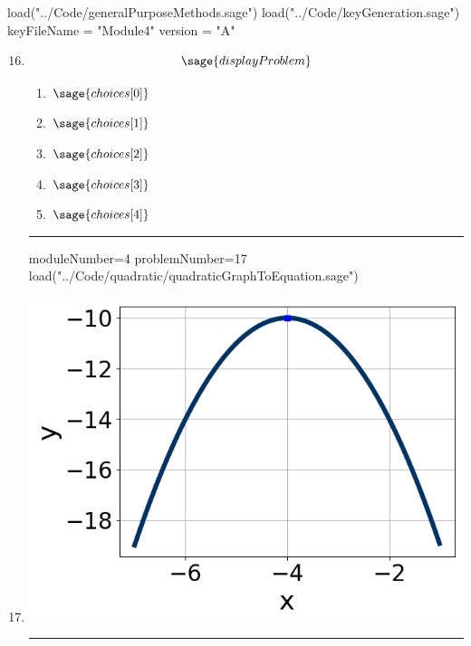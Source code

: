 \documentclass[14pt]{article}
\newcommand{\litem}[1]{\item#1\hspace*{-1cm}\rule{\textwidth}{0.4pt}}
\begin{document}
\pagestyle{fancy}

\begin{sagesilent}
load("../Code/generalPurposeMethods.sage")
load("../Code/keyGeneration.sage")
keyFileName = "Module4"
version = "A"
\end{sagesilent}

\begin{enumerate}
\setcounter{enumi}{15}


\begin{sagesilent}
moduleNumber=4
problemNumber=16
load("../Code/quadratic/quadraticFormula.sage")
\end{sagesilent}

\litem{ 
	\[ \sage{displayProblem} \]

	\begin{enumerate}[label=\Alph*.]
    \item \( \sage{choices[0]} \)
    \item \( \sage{choices[1]} \)
    \item \( \sage{choices[2]} \)
    \item \( \sage{choices[3]} \)
    \item \( \sage{choices[4]} \)
	\end{enumerate}
}

\begin{sagesilent}
moduleNumber=4
problemNumber=17
load("../Code/quadratic/quadraticGraphToEquation.sage")
\end{sagesilent}

\litem{ 

	\begin{center} \includegraphics[scale=0.3]{../Figures/quadraticGraphToEquationA.png} \end{center}

}
\end{enumerate}
\end{document}
